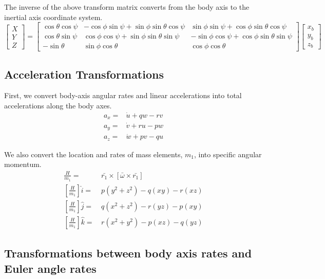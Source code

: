 \documentclass[
]{book}
\begin{document}
The inverse of the above transform matrix converts from the body axis to the inertial axis coordinate system.
\[
\begin{bmatrix}
X \\
Y \\
Z
\end{bmatrix} = 
\begin{bmatrix}
\cos\theta \cos\psi & - \cos\phi \sin\psi + \sin\phi \sin\theta \cos\psi & \sin\phi \sin\psi + \cos\phi \sin\theta \cos\psi \\
\cos\theta \sin\psi & \cos\phi \cos\psi + \sin\phi \sin\theta \sin\psi & -\sin\phi \cos\psi + \cos\phi \sin\theta \sin\psi  \\
-\sin\theta & \sin\phi \cos\theta & \cos\phi \cos\theta
\end{bmatrix}
\begin{bmatrix}
x_b \\
y_b \\
z_b 
\end{bmatrix}
\]

\hypertarget{acceleration-transformations}{%
\subsection{Acceleration Transformations}\label{acceleration-transformations}}

First, we convert body-axis angular rates and linear accelerations into total accelerations along the body axes.
\begin{align}
a_x =& \dot{u} + qw - rv \\
a_y =& \dot{v} + ru -pw \\
a_z =& \dot{w} + pv - qu
\end{align}

We also convert the location and rates of mass elements, \(m_1\), into specific angular momentum.
\begin{align}
\frac{H}{m_1} =& \, \bar{r_1} \times [\bar{\omega} \times \bar{r_1}] \\
\left[ \frac{H}{m_1} \right]\hat{i} =& \, p(y^2 + z^2) - q(xy) - r(xz)\\
\left[ \frac{H}{m_1} \right]\hat{j} =& \, q(x^2+z^2) - r(yz) - p(xy)\\
\left[ \frac{H}{m_1} \right] \hat{k} =& \, r(x^2+y^2) - p(xz) - q(yz)
\end{align}

\hypertarget{transformations-between-body-axis-rates-and-euler-angle-rates}{%
\subsection{Transformations between body axis rates and Euler angle rates}\label{transformations-between-body-axis-rates-and-euler-angle-rates}}
\end{document}
